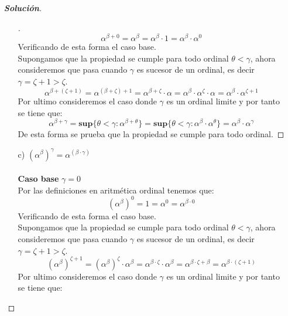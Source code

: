 \documentclass[11pt]{article}
\numberwithin{equation}{section}
\numberwithin{figure}{section}
\begin{document}
\begin{enumerate}
\begin{proof}[\textbf{Solución}]
\begin{itemize}
\begin{proof}[\unskip\nopunct]
        \begin{equation*}
            \alpha^{\beta+0}=\alpha^\beta=\alpha^\beta\cdot1=\alpha^\beta\cdot\alpha^0
        \end{equation*}
        Verificando de esta forma el caso base.\\
        Supongamos que la propiedad se cumple para todo ordinal $\theta<\gamma$, ahora consideremos que pasa cuando $\gamma$ es sucesor de un ordinal, es decir $\gamma=\zeta+1>\zeta$.
        \begin{equation*}
            \alpha^{\beta+(\zeta+1)}=\alpha^{(\beta+\zeta)+1}=\alpha^{\beta+\zeta}\cdot\alpha=\alpha^\beta\cdot\alpha^\zeta\cdot\alpha=\alpha^\beta\cdot\alpha^{\zeta+1}
        \end{equation*}
        Por ultimo consideremos el caso donde $\gamma$ es un ordinal limite y por tanto se tiene que:
        \begin{equation*}
            \alpha^{\beta+\gamma}=\textbf{sup}\{\theta<\gamma:\alpha^{\beta+\theta}\}=\textbf{sup}\{\theta<\gamma:\alpha^\beta\cdot\alpha^\theta\}=\alpha^\beta\cdot\alpha^\gamma
        \end{equation*}
        De esta forma se prueba que la propiedad se cumple para todo ordinal.
        \end{proof}
        \item[c)] $(\alpha^{\beta})^{\gamma}=\alpha^{(\beta\cdot\gamma)}$\\
        \\
        \textbf{Caso base} $\gamma=0$\\
        Por las definiciones en aritmética ordinal tenemos que:
        \begin{equation*}
            (\alpha^\beta)^0=1=\alpha^0=\alpha^{\beta\cdot0}
        \end{equation*}
         Verificando de esta forma el caso base.\\
        Supongamos que la propiedad se cumple para todo ordinal $\theta<\gamma$, ahora consideremos que pasa cuando $\gamma$ es sucesor de un ordinal, es decir $\gamma=\zeta+1>\zeta$.
        \begin{equation*}
            (\alpha^\beta)^{\zeta+1}=(\alpha^\beta)^\zeta\cdot\alpha^\beta=\alpha^{\beta\cdot\zeta}\cdot\alpha^\beta=\alpha^{\beta\cdot\zeta+\beta}=\alpha^{\beta\cdot(\zeta+1)}
        \end{equation*}
         Por ultimo consideremos el caso donde $\gamma$ es un ordinal limite y por tanto se tiene que:
         \begin{equation*}

\end{equation*}
\end{itemize}
\end{proof}
\end{enumerate}
\end{document}
